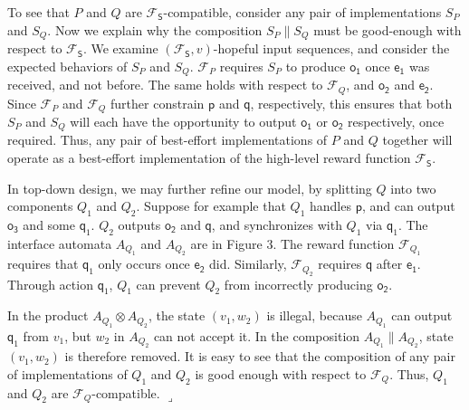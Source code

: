 To see that $P$ and $Q$ are $\mathcal{F}_{\mathsf{S}}$-compatible, consider any pair of implementations $S_{P}$ and $S_{Q}$. Now we explain why the composition $S_{P}\parallel S_{Q}$ must be good-enough with respect to $\mathcal{F}_{\mathsf{S}}$. We examine $(\mathcal{F}_{\mathsf{S}},v)$-hopeful input sequences, and consider the expected behaviors of $S_{P}$ and $S_{Q}$. $\mathcal{F}_{P}$ requires $S_{P}$ to produce $\mathsf{o_{1}}$ once $\mathsf{e_{1}}$ was received, and not before. The same holds with respect to $\mathcal{F}_{Q}$, and $\mathsf{o_{2}}$ and $\mathsf{e_{2}}$. Since $\mathcal{F}_{P}$ and $\mathcal{F}_{Q}$ further constrain $\mathsf{p}$ and $\mathsf{q}$, respectively, this ensures that both $S_{P}$ and $S_{Q}$ will each have the opportunity to output $\mathsf{o_{1}}$ or $\mathsf{o_{2}}$ respectively, once required. Thus, any pair of best-effort implementations of $P$ and $Q$ together will operate as a best-effort implementation of the high-level reward function $\mathcal{F}_{\mathsf{S}}$.\par
 
 
 
In top-down design, we may further refine our model, by splitting $Q$ into two components $Q_{1}$ and $Q_{2}$. Suppose for example that $Q_{1}$ handles $\mathsf{p}$, and can output $\mathsf{o_{3}}$ and some $\mathsf{q}_{1}$. $Q_{2}$ outputs $\mathsf{o_{2}}$ and $\mathsf{q}$, and synchronizes with $Q_{1}$ via $\mathsf{q}_{1}$. The interface automata $A_{Q_{1}}$ and $A_{Q_{2}}$ are in Figure 3. The reward function $\mathcal{F}_{Q_{1}}$ requires that $\mathsf{q}_{1}$ only occurs once $\mathsf{e_{2}}$ did. Similarly, $\mathcal{F}_{Q_{2}}$ requires $\mathsf{q}$ after $\mathsf{e_{1}}$. Through action $\mathsf{q}_{1}$, $Q_{1}$ can prevent $Q_{2}$ from incorrectly producing $\mathsf{o_{2}}$.\par
 
 
 
In the product $A_{Q_{1}}\otimes A_{Q_{2}}$, the state $(v_{1},w_{2})$ is illegal, because $A_{Q_{1}}$ can output $\mathsf{q}_{1}$ from $v_{1}$, but $w_{2}$ in $A_{Q_{2}}$ can not accept it. In the composition $A_{Q_{1}}\parallel A_{Q_{2}}$, state $(v_{1},w_{2})$ is therefore removed. It is easy to see that the composition of any pair of implementations of $Q_{1}$ and $Q_{2}$ is good enough with respect to $\mathcal{F}_{Q}$. Thus, $Q_{1}$ and $Q_{2}$ are $\mathcal{F}_{Q}$-compatible. $\lrcorner$\par
 
